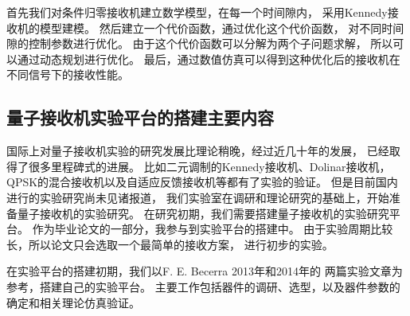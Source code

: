 首先我们对条件归零接收机建立数学模型，在每一个时间隙内，
采用Kennedy接收机的模型建模。
然后建立一个代价函数，通过优化这个代价函数，
对不同时间隙的控制参数进行优化。
由于这个代价函数可以分解为两个子问题求解，
所以可以通过动态规划进行优化。
最后，通过数值仿真可以得到这种优化后的接收机在不同信号下的接收性能。

\subsection{量子接收机实验平台的搭建主要内容}
国际上对量子接收机实验的研究发展比理论稍晚，经过近几十年的发展，
已经取得了很多里程碑式的进展。
比如二元调制的Kennedy接收机、Dolinar接收机，
QPSK的混合接收机以及自适应反馈接收机等都有了实验的验证。
但是目前国内进行的实验研究尚未见诸报道，
我们实验室在调研和理论研究的基础上，开始准备量子接收机的实验研究。
在研究初期，我们需要搭建量子接收机的实验研究平台。
作为毕业论文的一部分，我参与到实验平台的搭建中。
由于实验周期比较长，所以论文只会选取一个最简单的接收方案，
进行初步的实验。

在实验平台的搭建初期，我们以F. E. Becerra 2013年和2014年的
两篇实验文章为参考，搭建自己的实验平台。
主要工作包括器件的调研、选型，以及器件参数的确定和相关理论仿真验证。 


